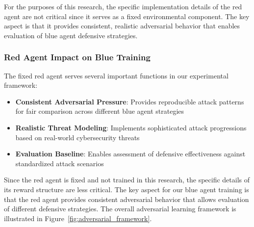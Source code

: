 \documentclass[12pt,oneside]{article}
\begin{document}
For the purposes of this research, the specific implementation details of the red agent are not critical since it serves as a fixed environmental component. The key aspect is that it provides consistent, realistic adversarial behavior that enables evaluation of blue agent defensive strategies.

\subsubsection{Red Agent Impact on Blue Training}
The fixed red agent serves several important functions in our experimental framework:
\begin{itemize}
\item \textbf{Consistent Adversarial Pressure}: Provides reproducible attack patterns for fair comparison across different blue agent strategies
\item \textbf{Realistic Threat Modeling}: Implements sophisticated attack progressions based on real-world cybersecurity threats
\item \textbf{Evaluation Baseline}: Enables assessment of defensive effectiveness against standardized attack scenarios
\end{itemize}

Since the red agent is fixed and not trained in this research, the specific details of its reward structure are less critical. The key aspect for our blue agent training is that the red agent provides consistent adversarial behavior that allows evaluation of different defensive strategies. The overall adversarial learning framework is illustrated in Figure~\ref{fig:adversarial_framework}.
\end{document}
